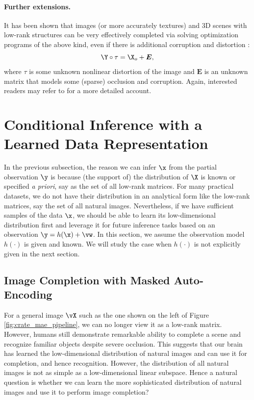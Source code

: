 \documentclass[../../book-main.tex]{subfiles}
\begin{document}
\paragraph{Further extensions.}
It has been shown that images (or more accurately textures) and 3D scenes
with low-rank structures can be very effectively completed via
solving optimization programs of the above kind, even if there is
additional corruption and distortion
\cite{Zhang2010TILTTI,Liang-ECCV2012,Yi_2023_ICCV}:
\begin{equation}
    \Y \circ \tau = \X_o + \boldsymbol{E},
\end{equation}
where $\tau$ is some unknown nonlinear distortion of the image and
$\boldsymbol{E}$ is an unknown matrix that models some (sparse)
occlusion and corruption. Again, interested readers may refer to
\cite{Wright-Ma-2022} for a more detailed account.

\section{Conditional Inference with a Learned Data Representation}
In the previous subsection, the reason we can infer $\x$ from the
partial observation $\y$ is because (the support of) the distribution of
$\X$ is known or specified {\em a priori}, say as the set of all
low-rank matrices. For many practical datasets, we do not have their
distribution in an analytical form like the low-rank matrices, say
the set of all natural images. Nevertheless, if we have sufficient
samples of the data $\x$, we should be able to learn its
low-dimensional distribution first and leverage it for future
inference tasks based on an observation $\y = h(\x) + \vw$. In this
section, we assume the observation model $h(\cdot)$ is given and
known. We will study the case when $h(\cdot)$ is not explicitly given
in the next section.

\subsection{Image Completion with Masked Auto-Encoding}
For a general image $\vX$ such as the one shown on the left of Figure
\ref{fig:crate_mae_pipeline}, we can no longer view it as a low-rank
matrix. However, humans still demonstrate remarkable ability to
complete a scene and recognize familiar objects despite severe
occlusion. This suggests that our brain has learned the
low-dimensional distribution of natural images and can use it for
completion, and hence recognition. However, the distribution of all
natural images is not as simple as a low-dimensional linear subspace.
Hence a natural question is whether we can learn the more
sophisticated distribution of natural images and use it to perform
image completion?
\end{document}
